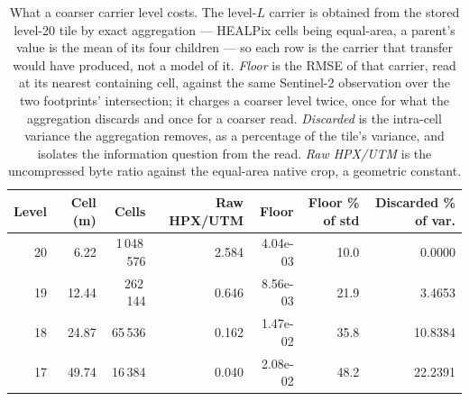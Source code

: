 \begin{table}[t]
\centering
\caption{What a coarser carrier level costs. The level-$L$ carrier is obtained from the stored level-20 tile by exact aggregation --- HEALPix cells being equal-area, a parent's value is the mean of its four children --- so each row is the carrier that transfer would have produced, not a model of it. \emph{Floor} is the RMSE of that carrier, read at its nearest containing cell, against the same Sentinel-2 observation over the two footprints' intersection; it charges a coarser level twice, once for what the aggregation discards and once for a coarser read. \emph{Discarded} is the intra-cell variance the aggregation removes, as a percentage of the tile's variance, and isolates the information question from the read. \emph{Raw HPX/UTM} is the uncompressed byte ratio against the equal-area native crop, a geometric constant.}
\label{tab:level_choice}
\footnotesize
\begin{tabular}{@{}rrrrrrr@{}}
\toprule
Level & Cell (m) & Cells & Raw HPX/UTM & Floor & Floor \% of std & Discarded \% of var. \\
\midrule
20 & 6.22 & 1\,048\,576 & 2.584 & 4.04e-03 & 10.0 & 0.0000 \\
19 & 12.44 & 262\,144 & 0.646 & 8.56e-03 & 21.9 & 3.4653 \\
18 & 24.87 & 65\,536 & 0.162 & 1.47e-02 & 35.8 & 10.8384 \\
17 & 49.74 & 16\,384 & 0.040 & 2.08e-02 & 48.2 & 22.2391 \\
\bottomrule
\end{tabular}
\end{table}
